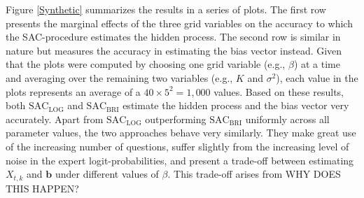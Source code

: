 \documentclass[aoas, preprint]{imsart}
\newcommand\ville[1]{{\color{red} #1 }}
\numberwithin{equation}{section}
\theoremstyle{plain}
\begin{document}
Figure \ref{Synthetic} summarizes the results in a series of plots. The first row presents the marginal effects of the three grid variables on the accuracy to which the SAC-procedure estimates the hidden process.  The second row is similar in nature but measures the accuracy in estimating the bias vector instead.  Given that the plots were computed by choosing one grid variable (e.g., $\beta$) at a time and averaging over the remaining two variables  (e.g., $K$ and $\sigma^2$), each value in the plots represents an average of a $40 \times 5^2 = 1,000$ values. Based on these results, both $\text{SAC}_{\text{LOG}}$ and  $\text{SAC}_{\text{BRI}}$ estimate the hidden process and the bias vector very accurately. Apart from $\text{SAC}_{\text{LOG}}$ outperforming $\text{SAC}_{\text{BRI}}$ uniformly across all parameter values, the two approaches behave very similarly.  They make great use of the increasing number of questions, suffer slightly from the increasing level of noise in the expert logit-probabilities, and present a trade-off between estimating $X_{t,k}$ and $\boldsymbol{b}$ under different values of $\beta$. This trade-off arises from \ville{WHY DOES THIS HAPPEN?}



%
%
%
%
\end{document}
